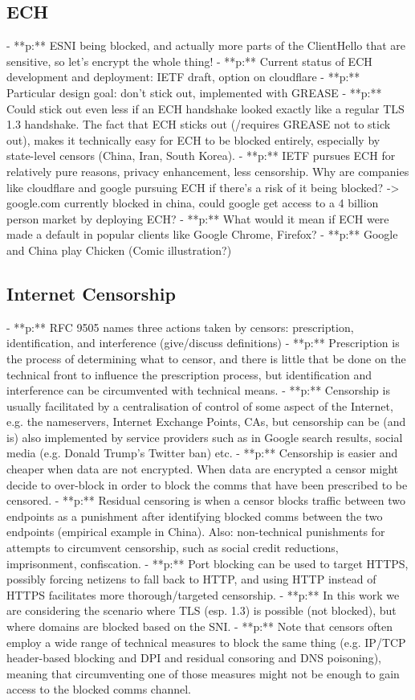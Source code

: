 \subsection{ECH}
      - **p:** ESNI being blocked, and actually more parts of the ClientHello that are sensitive, so let's encrypt the whole thing!
      - **p:** Current status of ECH development and deployment: IETF draft, option on cloudflare
      - **p:** Particular design goal: don't stick out, implemented with GREASE
      - **p:** Could stick out even less if an ECH handshake looked exactly like a regular TLS 1.3 handshake. The fact that ECH sticks out (/requires GREASE not to stick out), makes it technically easy for ECH to be blocked entirely, especially by state-level censors (China, Iran, South Korea).
      - **p:** IETF pursues ECH for relatively pure reasons, privacy enhancement, less censorship. Why are companies like cloudflare and google pursuing ECH if there's a risk of it being blocked? -> google.com currently blocked in china, could google get access to a 4 billion person market by deploying ECH?
      - **p:** What would it mean if ECH were made a default in popular clients like Google Chrome, Firefox?
      - **p:** Google and China play Chicken (Comic illustration?)
\subsection{Internet Censorship}
      - **p:** RFC 9505 names three actions taken by censors: prescription, identification, and interference (give/discuss definitions)
      - **p:** Prescription is the process of determining what to censor, and there is little that be done on the technical front to influence the prescription process, but identification and interference can be circumvented with technical means.
      - **p:** Censorship is usually facilitated by a centralisation of control of some aspect of the Internet, e.g. the nameservers, Internet Exchange Points, CAs, but censorship can be (and is) also implemented by service providers such as in Google search results, social media (e.g. Donald Trump's Twitter ban) etc.
      - **p:** Censorship is easier and cheaper when data are not encrypted. When data are encrypted a censor might decide to over-block in order to block the comms that have been prescribed to be censored.
     - **p:** Residual censoring is when a censor blocks traffic between two endpoints as a punishment after identifying blocked comms between the two endpoints (empirical example in China). Also: non-technical punishments for attempts to circumvent censorship, such as social credit reductions, imprisonment, confiscation.
     - **p:** Port blocking can be used to target HTTPS, possibly forcing netizens to fall back to HTTP, and using HTTP instead of HTTPS facilitates more thorough/targeted censorship.
     - **p:** In this work we are considering the scenario where TLS (esp. 1.3) is possible (not blocked), but where domains are blocked based on the SNI.
     - **p:** Note that censors often employ a wide range of technical measures to block the same thing (e.g. IP/TCP header-based blocking and DPI and residual consoring and DNS poisoning), meaning that circumventing one of those measures might not be enough to gain access to the blocked comms channel.


